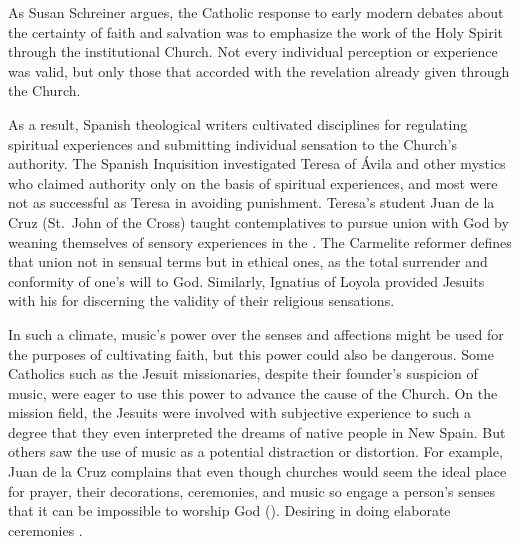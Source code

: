 As Susan Schreiner argues, the Catholic response to early modern debates about 
the certainty of faith and salvation was to emphasize the work of the Holy 
Spirit through the institutional Church.%
    \Autocite[131--208]{Schreiner:Certainty}
Not every individual perception or experience was valid, but only those that 
accorded with the revelation already given through the Church.

As a result, Spanish theological writers cultivated disciplines for regulating 
spiritual experiences and submitting individual sensation to the Church's 
authority.
The Spanish Inquisition investigated Teresa of Ávila and other mystics who 
claimed authority only on the basis of spiritual experiences, and most were not 
as successful as Teresa in avoiding punishment.
    \Autocites{Ahlgren:TeresaPolitics}{Francisca:Inquisition}
Teresa's student Juan de la Cruz (St.\ John of the Cross) taught contemplatives 
to pursue union with God by weaning themselves of sensory experiences in the 
.
The Carmelite reformer defines that union not in sensual terms but in ethical 
ones, as the total surrender and conformity of one's will to God.%
    \Autocite[bk.~I, ch.~5--7, 226--248]{JuandelaCruz:Subida}
Similarly, Ignatius of Loyola provided Jesuits with his  for discerning the validity of their religious sensations.%
    \Autocite[ch.~6]{Schreiner:Certainty}

In such a climate, music's power over the senses and affections might be used 
for the purposes of cultivating faith, but this power could also be dangerous.
Some Catholics such as the Jesuit missionaries, despite their founder's 
suspicion of music, were eager to use this power to advance the cause of the 
Church.
On the mission field, the Jesuits were involved with subjective experience to 
such a degree that they even interpreted the dreams of native people in New 
Spain.%
    \Autocite[40--41]{Bailey:Art}
But others saw the use of music as a potential distraction or distortion.
For example, Juan de la Cruz complains that even though churches would seem the 
ideal place for prayer, their decorations, ceremonies, and music so engage a 
person's senses that it can be impossible to worship God  ().%
    \Autocite[bk.~3, ch.~39--45, pp.~415--424]{JuandelaCruz:Subida}
Desiring  in doing elaborate ceremonies 
.%
    \Autocite[bk.~3, ch.~43, p.~420:
    ]
    {JuandelaCruz:Subida}

